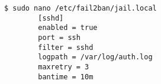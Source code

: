 
\begin{lstlisting}[language=term,caption=Konfiguration des ssh jails von fail2ban,label=fail2ban-ssh]
    $ sudo nano /etc/fail2ban/jail.local
        [sshd]
        enabled = true
        port = ssh
        filter = sshd
        logpath = /var/log/auth.log
        maxretry = 3
        bantime = 10m
\end{lstlisting}